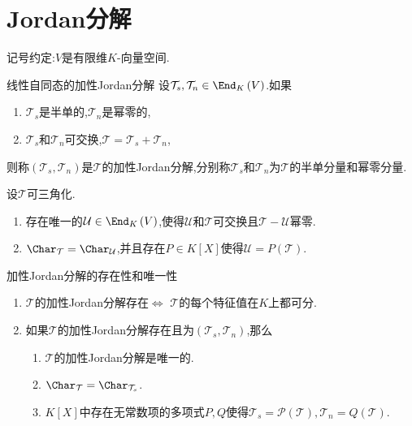 \section{Jordan分解}

记号约定:$V$是有限维$K$-向量空间.

\begin{definition}{线性自同态的加性Jordan分解}{}
	设$\mathcal{T}_{s},\mathcal{T}_{n}\in\End_{K}\left(V\right)$.如果
	\begin{enumerate}
		\item $\mathcal{T}_{s}$是半单的,$\mathcal{T}_{n}$是幂零的,
		\item $\mathcal{T}_{s}$和$\mathcal{T}_{n}$可交换,$\mathcal{T}=\mathcal{T}_{s}+\mathcal{T}_{n}$,
	\end{enumerate}
	则称$\left(\mathcal{T}_{s},\mathcal{T}_{n}\right)$是$\mathcal{T}$的加性Jordan分解,分别称$\mathcal{T}_{s}$和$\mathcal{T}_{n}$为$\mathcal{T}$的半单分量和幂零分量.
\end{definition}

\begin{lemma}{}{}
	设$\mathcal{T}$可三角化.
	\begin{enumerate}
		\item 存在唯一的$\mathcal{U}\in\End_{K}\left(V\right)$,使得$\mathcal{U}$和$\mathcal{T}$可交换且$\mathcal{T}-\mathcal{U}$幂零.
		\item $\Char_{\mathcal{T}}=\Char_{\mathcal{U}}$,并且存在$P\in K[X]$使得$\mathcal{U}=P\left(\mathcal{T}\right)$.
	\end{enumerate}
\end{lemma}

\begin{theorem}{加性Jordan分解的存在性和唯一性}{}
	\begin{enumerate}
		\item $\mathcal{T}$的加性Jordan分解存在$\iff$ $\mathcal{T}$的每个特征值在$K$上都可分.
		\item 如果$\mathcal{T}$的加性Jordan分解存在且为$\left(\mathcal{T}_{s},\mathcal{T}_{n}\right)$,那么
		\begin{enumerate}
			\item $\mathcal{T}$的加性Jordan分解是唯一的.
			\item $\Char_{\mathcal{T}}=\Char_{\mathcal{T}_{s}}$.
			\item $K[X]$中存在无常数项的多项式$P,Q$使得$\mathcal{T}_{s}=\mathcal{P}\left(\mathcal{T}\right),\mathcal{T}_{n}=Q\left(\mathcal{T}\right)$.
		\end{enumerate}
	\end{enumerate}
\end{theorem}

